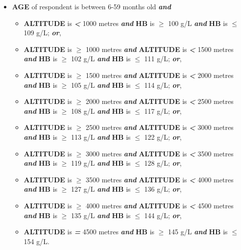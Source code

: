 \documentclass[12pt,a4paper]{article}
\begin{document}
\begin{itemize}
\item
  \textbf{AGE} of respondent is between 6-59 months old \textbf{\emph{and}}

  \begin{itemize}
  \item
    \textbf{ALTITUDE} is \textbf{\emph{\textless{}}} 1000 metres \textbf{\emph{and}} \textbf{HB} is \textbf{\emph{\(\geq\)}} 100 g/L \textbf{\emph{and}} \textbf{HB} is \textbf{\emph{\(\leq\)}} 109 g/L; \textbf{\emph{or}},
  \item
    \textbf{ALTITUDE} is \textbf{\emph{\(\geq\)}} 1000 metres \textbf{\emph{and}} \textbf{ALTITUDE} is \textbf{\emph{\textless{}}} 1500 metres \textbf{\emph{and}} \textbf{HB} is \textbf{\emph{\(\geq\)}} 102 g/L \textbf{\emph{and}} \textbf{HB} is \textbf{\emph{\(\leq\)}} 111 g/L; \textbf{\emph{or}},
  \item
    \textbf{ALTITUDE} is \textbf{\emph{\(\geq\)}} 1500 metres \textbf{\emph{and}} \textbf{ALTITUDE} is \textbf{\emph{\textless{}}} 2000 metres \textbf{\emph{and}} \textbf{HB} is \textbf{\emph{\(\geq\)}} 105 g/L \textbf{\emph{and}} \textbf{HB} is \textbf{\emph{\(\leq\)}} 114 g/L; \textbf{\emph{or}},
  \item
    \textbf{ALTITUDE} is \textbf{\emph{\(\geq\)}} 2000 metres \textbf{\emph{and}} \textbf{ALTITUDE} is \textbf{\emph{\textless{}}} 2500 metres \textbf{\emph{and}} \textbf{HB} is \textbf{\emph{\(\geq\)}} 108 g/L \textbf{\emph{and}} \textbf{HB} is \textbf{\emph{\(\leq\)}} 117 g/L; \textbf{\emph{or}},
  \item
    \textbf{ALTITUDE} is \textbf{\emph{\(\geq\)}} 2500 metres \textbf{\emph{and}} \textbf{ALTITUDE} is \textbf{\emph{\textless{}}} 3000 metres \textbf{\emph{and}} \textbf{HB} is \textbf{\emph{\(\geq\)}} 113 g/L \textbf{\emph{and}} \textbf{HB} is \textbf{\emph{\(\leq\)}} 122 g/L; \textbf{\emph{or}},
  \item
    \textbf{ALTITUDE} is \textbf{\emph{\(\geq\)}} 3000 metres \textbf{\emph{and}} \textbf{ALTITUDE} is \textbf{\emph{\textless{}}} 3500 metres \textbf{\emph{and}} \textbf{HB} is \textbf{\emph{\(\geq\)}} 119 g/L \textbf{\emph{and}} \textbf{HB} is \textbf{\emph{\(\leq\)}} 128 g/L; \textbf{\emph{or}},
  \item
    \textbf{ALTITUDE} is \textbf{\emph{\(\geq\)}} 3500 metres \textbf{\emph{and}} \textbf{ALTITUDE} is \textbf{\emph{\textless{}}} 4000 metres \textbf{\emph{and}} \textbf{HB} is \textbf{\emph{\(\geq\)}} 127 g/L \textbf{\emph{and}} \textbf{HB} is \textbf{\emph{\(\leq\)}} 136 g/L; \textbf{\emph{or}},
  \item
    \textbf{ALTITUDE} is \textbf{\emph{\(\geq\)}} 4000 metres \textbf{\emph{and}} \textbf{ALTITUDE} is \textbf{\emph{\textless{}}} 4500 metres \textbf{\emph{and}} \textbf{HB} is \textbf{\emph{\(\geq\)}} 135 g/L \textbf{\emph{and}} \textbf{HB} is \textbf{\emph{\(\leq\)}} 144 g/L; \textbf{\emph{or}},
  \item
    \textbf{ALTITUDE} is \textbf{\emph{=}} 4500 metres \textbf{\emph{and}} \textbf{HB} is \textbf{\emph{\(\geq\)}} 145 g/L \textbf{\emph{and}} \textbf{HB} is \textbf{\emph{\(\leq\)}} 154 g/L.
  \end{itemize}
\end{itemize}
\end{document}
